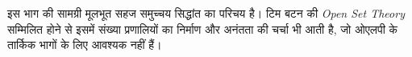 \documentclass[../../include/open-logic-part]{subfiles}
\begin{document}

\begin{editorial}
  इस भाग की सामग्री मूलभूत सहज समुच्चय सिद्धांत का परिचय है। टिम बटन की
  \emph{Open Set Theory} सम्मिलित होने से इसमें संख्या प्रणालियों का निर्माण
  और अनंतता की चर्चा भी आती है, जो ओएलपी के तार्किक भागों के लिए आवश्यक नहीं
  हैं।
\end{editorial}







\OLEndPartHook
\end{document}
